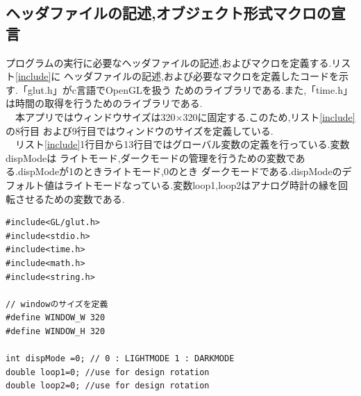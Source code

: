 \documentclass[a4j]{jarticle}
\begin{document}
    \subsection{ヘッダファイルの記述,オブジェクト形式マクロの宣言}
    プログラムの実行に必要なヘッダファイルの記述,およびマクロを定義する.リスト\ref{include}に
    ヘッダファイルの記述,および必要なマクロを定義したコードを示す.「glut.h」がc言語でOpenGLを扱う
    ためのライブラリである.また,「time.h」は時間の取得を行うためのライブラリである.\\
    　本アプリではウィンドウサイズは320$\times$320に固定する.このため,リスト\ref{include}の8行目
    および9行目ではウィンドウのサイズを定義している.\\
    　リスト\ref{include}1行目から13行目ではグローバル変数の定義を行っている.変数dispModeは
    ライトモード,ダークモードの管理を行うための変数である.dispModeが1のときライトモード,0のとき
    ダークモードである.dispModeのデフォルト値はライトモードなっている.変数loop1,loop2はアナログ時計の縁を回転させるための変数である.
    \begin{lstlisting}[basicstyle=\ttfamily\footnotesize, frame=single,label=include,caption=定数および変数の定義]
#include<GL/glut.h>
#include<stdio.h>
#include<time.h>
#include<math.h>
#include<string.h>

// windowのサイズを定義
#define WINDOW_W 320
#define WINDOW_H 320

int dispMode =0; // 0 : LIGHTMODE 1 : DARKMODE
double loop1=0; //use for design rotation
double loop2=0; //use for design rotation
                  \end{lstlisting}
\end{document}
